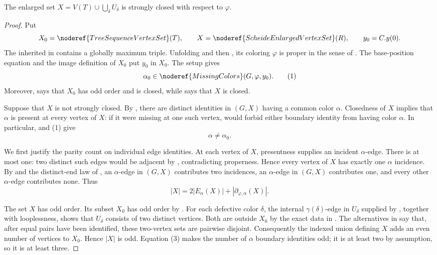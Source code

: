 \begin{lemma}
The enlarged set $X=V(T)\cup\bigcup_\delta U_\delta$ is strongly closed
with respect to $\varphi$.
\end{lemma}
\begin{proof}
Put
\[
 X_0=\noderef{TreeSequenceVertexSet}(T),\qquad
 X=\noderef{ScheideEnlargedVertexSet}(R),\qquad
 y_0=C.y(0).
\]
The inherited  in
 contains a globally maximum triple.
Unfolding  and then , its
coloring $\varphi$ is proper in the sense of
.  The base-position equation and the image
definition of $X_0$ put $y_0$ in $X_0$.  The setup
 gives
\[
 \alpha_0\in\noderef{MissingColors}(G,\varphi,y_0).          \tag{1}
\]
Moreover,  says that $X_0$ has odd
order and is closed, while  says that $X$
is closed.

Suppose that $X$ is not strongly closed.  By
, there are distinct identities in
$(G,X)$ having a common color $\alpha$.  Closedness
of $X$ implies that $\alpha$ is present at every vertex of $X$: if it were
missing at one such vertex,  would forbid
either boundary identity from having color $\alpha$.  In particular,
 and (1) give
\[
 \alpha\ne\alpha_0.                                        \tag{2}
\]

We first justify the parity count on individual edge identities.  At each
vertex of $X$, presentness supplies an incident $\alpha$-edge.  There is at
most one: two distinct such edges would be adjacent by
, contradicting properness.  Hence every vertex of
$X$ has exactly one $\alpha$ incidence.  By  and the
distinct-end law of , an $\alpha$-edge in
$(G,X)$ contributes two incidences, an
$\alpha$-edge in $(G,X)$ contributes one, and every
other $\alpha$-edge contributes none.  Thus
\[
 |X|=2|E_\alpha(X)|+|\partial_{\varphi,\alpha}(X)|.          \tag{3}
\]

The set $X$ has odd order.  Its subset $X_0$ has odd order by
.  For each defective color $\delta$,
the internal $\gamma(\delta)$-edge in $U_\delta$ supplied by
, together with looplessness,
shows that $U_\delta$ consists of two distinct vertices.  Both are outside
$X_0$ by the exact data in .
The alternatives in  say that,
after equal pairs have been identified, these two-vertex sets are pairwise
disjoint.  Consequently the indexed union defining $X$ adds an even number
of vertices to $X_0$.  Hence $|X|$ is odd.  Equation (3) makes the number
of $\alpha$ boundary identities odd; it is at least two by assumption, so
it is at least three.


\end{proof}
